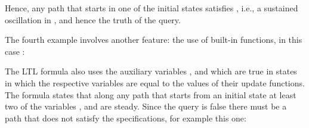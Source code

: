 \documentclass[letterpaper,10pt,english]{sphinxmanual}
\begin{document}
\begin{sphinxVerbatim}[commandchars=\\\{\}]
          
\end{sphinxVerbatim}

Hence, any path that starts in one of the initial states satisfies , i.e.,
a sustained oscillation in , and hence the truth of the query.

The fourth example involves another feature: the use of {\hyperref[\detokenize{Installation:installation-nusmv}]{}} built-in functions, in this case :

\begin{sphinxVerbatim}[commandchars=\\\{\}]
  
  
     
\end{sphinxVerbatim}

The LTL formula also uses the auxiliary variables ,  and  which are true in states in which the respective variables
are equal to the values of their update functions.
The formula states that along any path that starts from an initial state at least two of the variables ,  and  are steady.
Since the query is false there must be a path that does not satisfy the specifications, for example this one:

\begin{sphinxVerbatim}[commandchars=\\\{\}]
            
\end{sphinxVerbatim}
\end{document}
